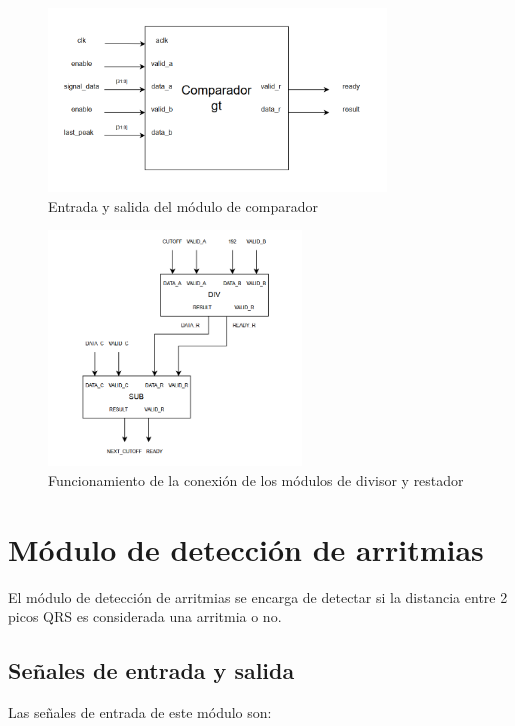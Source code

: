 \begin{figure}[h!]
    \centering
    \includegraphics[width=0.8\textwidth]{./Images/img_implementacion_hw/comparadorgt.png}
    \caption{Entrada y salida del módulo de comparador}
    \label{fig:comparadorgt}
\end{figure}

\begin{figure}[h!]
    \centering
    \includegraphics[width=0.6\textwidth]{./Images/img_implementacion_hw/DiagramaDivisorrestador.png}
    \caption{Funcionamiento de la conexión de los módulos de divisor y restador}
    \label{fig:divisorrestador}
\end{figure}

\section{Módulo de detección de arritmias}

El módulo de detección de arritmias se encarga de detectar si la distancia entre 2 picos QRS es considerada una arritmia o no.
 
\subsection{Señales de entrada y salida}
Las señales de entrada de este módulo son:

